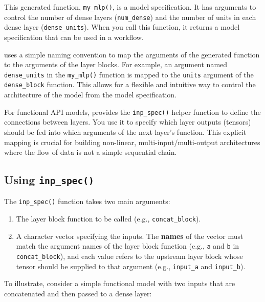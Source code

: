 This generated function, \texttt{my\_mlp()}, is a  model specification. It has arguments to control the number of dense layers (\texttt{num\_dense}) and the number of units in each dense layer (\texttt{dense\_units}). When you call this function, it returns a  model specification that can be used in a  workflow.

 uses a simple naming convention to map the arguments of the generated function to the arguments of the layer blocks. For example, an argument named \texttt{dense\_units} in the \texttt{my\_mlp()} function is mapped to the \texttt{units} argument of the \texttt{dense\_block} function. This allows for a flexible and intuitive way to control the architecture of the  model from the  model specification.

For functional API models,  provides the \texttt{inp\_spec()} helper function to define the connections between layers. You use it to specify which layer outputs (tensors) should be fed into which arguments of the next layer's function. This explicit mapping is crucial for building non-linear, multi-input/multi-output architectures where the flow of data is not a simple sequential chain.

\subsection{\texorpdfstring{Using \texttt{inp\_spec()}}{Using inp\_spec()}}\label{using-inp_spec}

The \texttt{inp\_spec()} function takes two main arguments:

\begin{enumerate}
\def\labelenumi{\arabic{enumi}.}
\tightlist
\item
  The layer block function to be called (e.g., \texttt{concat\_block}).
\item
  A character vector specifying the inputs. The \textbf{names} of the vector must match the argument names of the layer block function (e.g., \texttt{a} and \texttt{b} in \texttt{concat\_block}), and each value refers to the upstream layer block whose tensor should be supplied to that argument (e.g., \texttt{input\_a} and \texttt{input\_b}).
\end{enumerate}

To illustrate, consider a simple functional model with two inputs that are concatenated and then passed to a dense layer:

